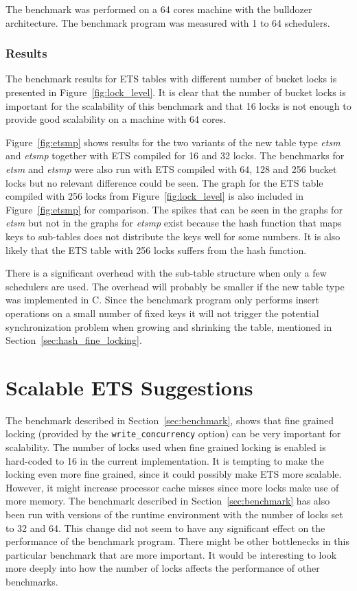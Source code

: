 \documentclass[aps,pre,preprint,nofootinbib]{revtex4}
\begin{document}
The benchmark was performed on a 64 cores machine with the bulldozer architecture.
The benchmark program was measured with 1 to 64 schedulers. 

\subsubsection{Results}

The benchmark results for ETS tables with different number of bucket locks is presented in Figure~\ref{fig:lock_level}.
It is clear that the number of bucket locks is important for the scalability of this benchmark and that 16 locks is not enough to provide good scalability on a machine with 64 cores.

Figure~\ref{fig:etsmp} shows results for the two variants of the new table type \emph{etsm} and \emph{etsmp} together with ETS compiled for 16 and 32 locks.
The benchmarks for \emph{etsm} and \emph{etsmp} were also run with ETS compiled with 64, 128 and 256 bucket locks but no relevant difference could be seen.
The graph for the ETS table compiled with 256 locks from Figure~\ref{fig:lock_level} is also included in Figure~\ref{fig:etsmp} for comparison.
The spikes that can be seen in the graphs for \emph{etsm} but not in the graphs for \emph{etsmp} exist because the hash function that maps keys to sub-tables does not distribute the keys well for some numbers.
It is also likely that the ETS table with 256 locks suffers from the hash function.

There is a significant overhead with the sub-table structure when only a few schedulers are used.
The overhead will probably be smaller if the new table type was implemented in C.
Since the benchmark program only performs insert operations on a small number of fixed keys it will not trigger the potential synchronization problem when growing and shrinking the table, mentioned in Section~\ref{sec:hash_fine_locking}.       



\section{Scalable ETS Suggestions}

The benchmark described in Section~\ref{sec:benchmark}, shows that fine grained locking (provided by the \verb|write_concurrency| option) can be very important for scalability.
The number of locks used when fine grained locking is enabled is hard-coded to 16 in the current implementation.
It is tempting to make the locking even more fine grained, since it could possibly make ETS more scalable.
However, it might increase processor cache misses since more locks make use of more memory.
The benchmark described in Section~\ref{sec:benchmark} has also been run with versions of the runtime environment with the number of locks set to 32 and 64.
This change did not seem to have any significant effect on the performance of the benchmark program.
There might be other bottlenecks in this particular benchmark that are more important.
It would be interesting to look more deeply into how the number of locks affects the performance of other benchmarks.
\end{document}

